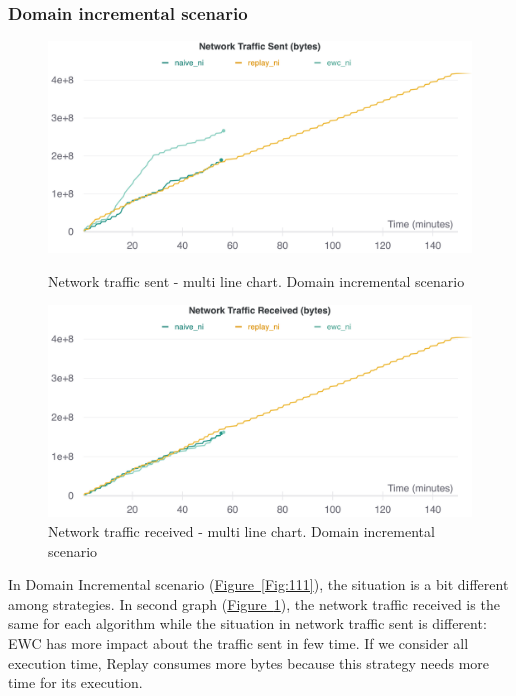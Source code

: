 \documentclass[english, LaM, oneside]{sapthesis}%
\begin{document}
\subsubsection{Domain incremental scenario}

\begin{figure}[h]
   \begin{minipage}{0.48\textwidth}
     \centering
     \includegraphics[width=1.1\linewidth]{overview network traffic sent ni.png}
     \caption{Network traffic sent - multi line chart. Domain incremental scenario}\label{Fig:111}
   \end{minipage}\hfill
   \begin{minipage}{0.48\textwidth}
     \centering
     \includegraphics[width=1.1\linewidth]{overview network traffic received ni.png}
     \caption{Network traffic received - multi line chart. Domain incremental scenario}\label{Fig:112}
   \end{minipage}
\end{figure}
In Domain Incremental scenario (\hyperref[Fig:111]{Figure~\ref*{Fig:111}}), the situation is a bit different among strategies. In second graph  (\hyperref[Fig:112]{Figure~\ref*{Fig:112}}), the network traffic received is the same for each algorithm while the situation in network traffic sent is different: EWC has more impact about the traffic sent in few time. If we consider all execution time, Replay consumes more bytes because this strategy needs more time for its execution.
\end{document}
